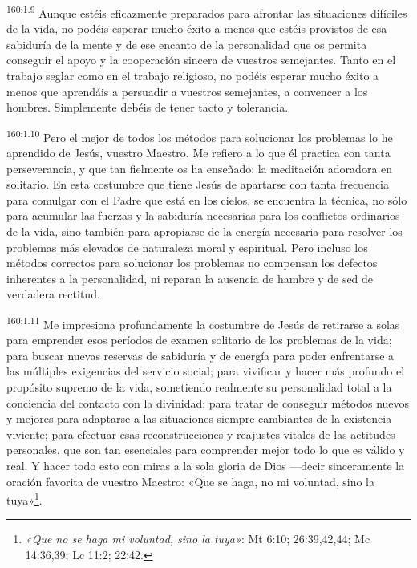 \par
\textsuperscript{160:1.9} Aunque estéis eficazmente preparados para afrontar las situaciones difíciles de la vida, no podéis esperar mucho éxito a menos que estéis provistos de esa sabiduría de la mente y de ese encanto de la personalidad que os permita conseguir el apoyo y la cooperación sincera de vuestros semejantes. Tanto en el trabajo seglar como en el trabajo religioso, no podéis esperar mucho éxito a menos que aprendáis a persuadir a vuestros semejantes, a convencer a los hombres. Simplemente debéis de tener tacto y tolerancia.

\par
\textsuperscript{160:1.10} Pero el mejor de todos los métodos para solucionar los problemas lo he aprendido de Jesús, vuestro Maestro. Me refiero a lo que él practica con tanta perseverancia, y que tan fielmente os ha enseñado: la meditación adoradora en solitario. En esta costumbre que tiene Jesús de apartarse con tanta frecuencia para comulgar con el Padre que está en los cielos, se encuentra la técnica, no sólo para acumular las fuerzas y la sabiduría necesarias para los conflictos ordinarios de la vida, sino también para apropiarse de la energía necesaria para resolver los problemas más elevados de naturaleza moral y espiritual. Pero incluso los métodos correctos para solucionar los problemas no compensan los defectos inherentes a la personalidad, ni reparan la ausencia de hambre y de sed de verdadera rectitud.

\par
\textsuperscript{160:1.11} Me impresiona profundamente la costumbre de Jesús de retirarse a solas para emprender esos períodos de examen solitario de los problemas de la vida; para buscar nuevas reservas de sabiduría y de energía para poder enfrentarse a las múltiples exigencias del servicio social; para vivificar y hacer más profundo el propósito supremo de la vida, sometiendo realmente su personalidad total a la conciencia del contacto con la divinidad; para tratar de conseguir métodos nuevos y mejores para adaptarse a las situaciones siempre cambiantes de la existencia viviente; para efectuar esas reconstrucciones y reajustes vitales de las actitudes personales, que son tan esenciales para comprender mejor todo lo que es válido y real. Y hacer todo esto con miras a la sola gloria de Dios ---decir sinceramente la oración favorita de vuestro Maestro: «Que se haga, no mi voluntad, sino la tuya»\footnote{\textit{«Que no se haga mi voluntad, sino la tuya»}: Mt 6:10; 26:39,42,44; Mc 14:36,39; Lc 11:2; 22:42.}.

